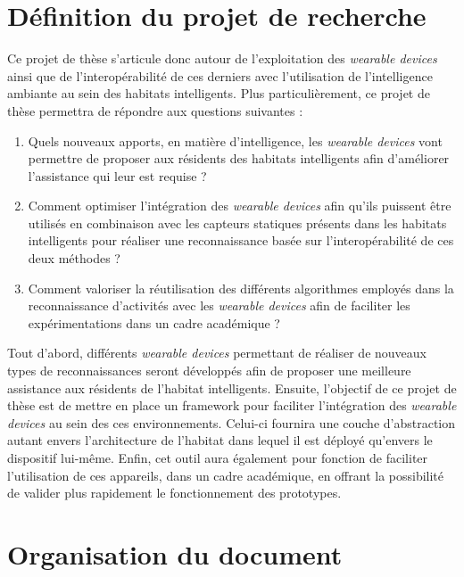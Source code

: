 {{\section{Définition du projet de recherche}
\label{sec:def_proj}
Ce projet de thèse s'articule donc autour de l'exploitation des \textit{wearable devices} ainsi que de l'interopérabilité de ces derniers avec l'utilisation de l'intelligence ambiante au sein des habitats intelligents. Plus particulièrement, ce projet de thèse permettra de répondre aux questions suivantes : 

\begin{enumerate}
	\item 
		\label{question:1}
		Quels nouveaux apports, en matière d'intelligence, les \textit{wearable devices} vont permettre de proposer aux résidents des habitats intelligents afin d'améliorer l'assistance qui leur est requise ?

	\item 
		\label{question:2}
		Comment optimiser l'intégration des \textit{wearable devices} afin qu'ils puissent être utilisés en combinaison avec les capteurs statiques présents dans les habitats intelligents pour réaliser une reconnaissance basée sur l'interopérabilité de ces deux méthodes ?
	
	\item 
		\label{question:3}
		Comment valoriser la réutilisation des différents algorithmes employés dans la reconnaissance d'activités avec les \textit{wearable devices} afin de faciliter les expérimentations dans un cadre académique ?
\end{enumerate}

Tout d'abord, différents \textit{wearable devices} permettant de réaliser de nouveaux types de reconnaissances seront développés afin de proposer une meilleure assistance aux résidents de l'habitat intelligents. Ensuite, l'objectif de ce projet de thèse est de mettre en place un framework pour faciliter l'intégration des \textit{wearable devices} au sein des ces environnements. Celui-ci fournira une couche d'abstraction autant envers l'architecture de l'habitat dans lequel il est déployé qu'envers le dispositif lui-même. Enfin, cet outil aura également pour fonction de faciliter l'utilisation de ces appareils, dans un cadre académique, en offrant la possibilité de valider plus rapidement le fonctionnement des prototypes.

\section{Organisation du document}

}}
